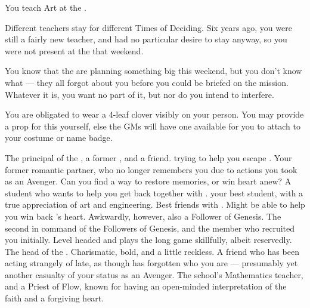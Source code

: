 \documentclass[char]{GL2020}
\begin{document}
\begin{itemz}[Notes]
	\item You teach Art at the \pSchool{}.
	\item Different teachers stay for different Times of Deciding. Six years ago, you were still a fairly new teacher, and had no particular desire to stay anyway, so you were not present at the \pSc{} that weekend.
	\item You know that the \pGoaties{} are planning something big this weekend, but you don't know what — they all forgot about you before you could be briefed on the mission. Whatever it is, you want no part of it, but nor do you intend to interfere.
	\item You are obligated to wear a 4-leaf clover visibly on your person. You may provide a prop for this yourself, else the GMs will have one available for you to attach to your costume or name badge.
\end{itemz}

\begin{contacts}
	\contact{\cPrincipal{}} The principal of the \pSchool{}, a former \pShippie{}, and a friend. \cPrincipal{\Theyare} trying to help you escape \cGenesis{}.
\contact{\cHeadScientist{}} Your former romantic partner, who no longer remembers you due to actions you took as an Avenger. Can you find a way to restore \cHeadScientist{\their} memories, or win \cHeadScientist{\their} heart anew?
\contact{\cInitiate{}} A \pShippie{} student who wants to help you get back together with \cHeadScientist{}. \cInitiate{\theyare} your best student, with a true appreciation of art and engineering.
	\contact{\cChupInventor{}} Best friends with \cHeadScientist{}. Might be able to help you win back \cHeadScientist{}'s heart. Awkwardly, however, also a Follower of Genesis.
\contact{\cChupSecond{}} The second in command of the Followers of Genesis, and the member who recruited you initially. Level headed and plays the long game skillfully, albeit reservedly.
	\contact{\cChupLeader{}}The head of the \pGoaties{}. Charismatic, bold, and a little reckless.
	\contact{\cLibrarian{}} A friend who has been acting strangely of late, as though \cLibrarian{\they} has forgotten who you are — presumably yet another casualty of your status as an Avenger.
	\contact{\cFlowPriest{}} The school's Mathematics teacher, and a Priest of Flow, known for having an open-minded interpretation of the faith and a forgiving heart. 
\end{contacts}
\end{document}
